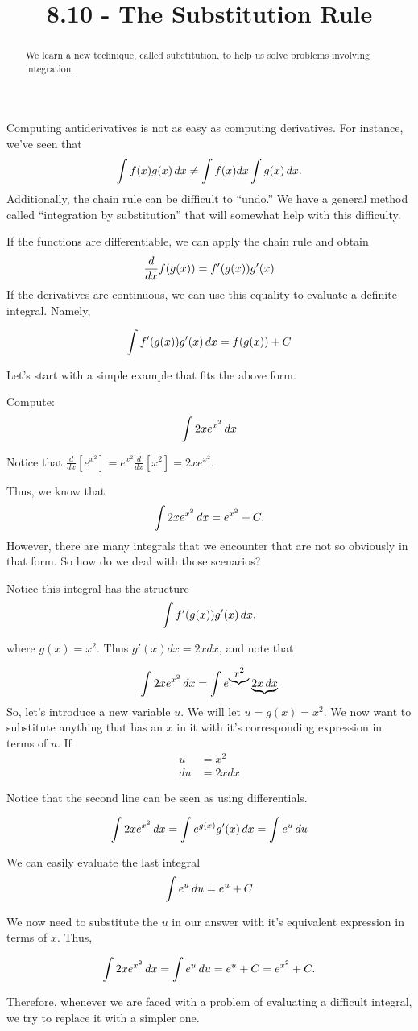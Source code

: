 \documentclass{ximera}
\title{8.10 - The Substitution Rule}
\begin{document}
\begin{abstract}
  We learn a new technique, called substitution, to help us solve
  problems involving integration.
\end{abstract}
\maketitle


Computing antiderivatives is not as easy as computing derivatives. For instance, we've seen that 
\[\int f(x)g(x)\mathop{}\!d x \neq \int f(x)dx\int g(x)\mathop{}\!d x.
\]
Additionally, the chain rule can be difficult to ``undo.''  We
have a general method called ``integration by substitution'' that will
somewhat help with this difficulty. 

If the functions are differentiable, we can apply the chain rule and obtain
\[
\frac{d}{\mathop{}\!d x} f(g(x)) = f'(g(x))g'(x)
\]
If the derivatives are continuous, we can use this equality to evaluate a definite integral. Namely,

 \[ \int f'(g(x))g'(x) \mathop{}\!d x = {f(g(x))}+C \]

Let's start with a simple example that fits the above form.
\begin{example}
Compute:
\[
\int 2x e^{x^2}\mathop{}\!d x
\]
\begin{explanation}
Notice that $\frac{d}{dx}\left[e^{x^2}\right]=e^{x^2}\frac{d}{dx}\left[x^2\right]=2xe^{x^2}$.

Thus, we know that 
\[
\int 2x e^{x^2}\mathop{}\!d x=e^{x^2}+C.
\]
However, there are many integrals that we encounter that are not so obviously in that form. So how do we deal with those scenarios?

Notice this integral has the structure
\[
\int f'(g(x)) g'(x) \mathop{}\!d x ,  
\]


where $g(x) =x^2$. Thus $g'(x)dx =2xdx$, and note that

\[
\int 2x e^{x^2}\mathop{}\!d x
=\int e^{\underbrace{x^2}}\underbrace{2x\mathop{}\!d x}
\]
So, let's introduce a new variable $u$. We will let $u=g(x)=x^2$. We now want to substitute anything that has an $x$ in it with it's corresponding expression in terms of $u$.
If 
\begin{align*}
    u&=x^2\\
    du&=2xdx
\end{align*}

Notice that the second line can be seen as using differentials.


\[
\int 2x e^{x^2}\mathop{}\!d x=\int e^{g(x)}g'(x)\mathop{}\!d x=\int e^{u}\mathop{}\!d u
\]

We can easily evaluate the last integral
\[
\int e^{u}\d u= e^u+C

\]

We now need to substitute the $u$ in our answer with it's equivalent expression in terms of $x$. 
Thus,

\[
\int 2x e^{x^2}\mathop{}\!d x=\int e^{u}\mathop{}\!d u=e^u+C=e^{x^2}+C.
\]

Therefore, whenever we are faced with a problem of evaluating a difficult integral, we try to  replace it with  a simpler one.


\end{explanation}
\end{example}
\end{document}
